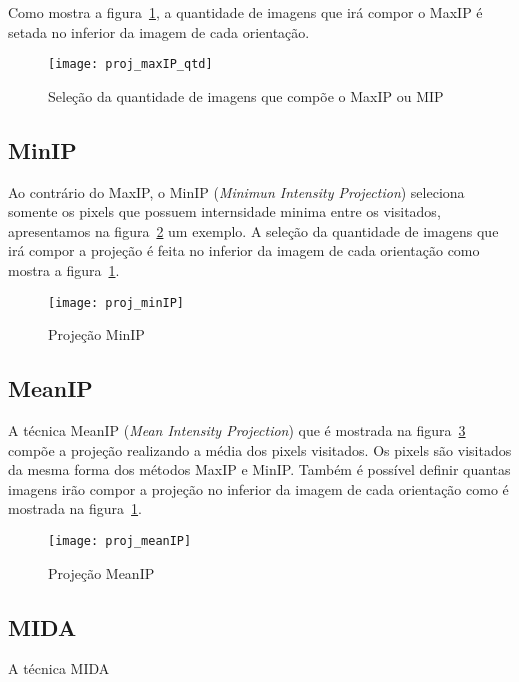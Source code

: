 Como mostra a figura~\ref{fig:proj_maxip_qtd}, a quantidade de imagens que irá compor o MaxIP é setada no inferior da imagem de cada orientação.

\begin{figure}[H]
\centering
\texttt{[image: proj\_maxIP\_qtd]}
\caption{Seleção da quantidade de imagens que compõe o MaxIP ou MIP}
\label{fig:proj_maxip_qtd}
\end{figure}

\subsection{MinIP}

Ao contrário do MaxIP, o MinIP (\textit{Minimun Intensity Projection}) seleciona somente os pixels que possuem internsidade minima entre os visitados, apresentamos na figura~\ref{fig:proj_minIP} um exemplo. A seleção da quantidade de imagens que irá compor a projeção é feita no inferior da imagem de cada orientação como mostra a figura~\ref{fig:proj_maxip_qtd}.

\begin{figure}[H]
\centering
\texttt{[image: proj\_minIP]}
\caption{Projeção MinIP}
\label{fig:proj_minIP}
\end{figure}

\subsection{MeanIP}
A técnica MeanIP (\textit{Mean Intensity Projection}) que é mostrada na figura~\ref{fig:proj_meanIP} compõe a projeção realizando a média dos pixels visitados. Os pixels são visitados da mesma forma dos métodos MaxIP e MinIP. Também é possível definir quantas imagens irão compor a projeção no inferior da imagem de cada orientação como é mostrada na figura~\ref{fig:proj_maxip_qtd}.

\begin{figure}[H]
\centering
\texttt{[image: proj\_meanIP]}
\caption{Projeção MeanIP}
\label{fig:proj_meanIP}
\end{figure}

\subsection{MIDA}

A técnica MIDA